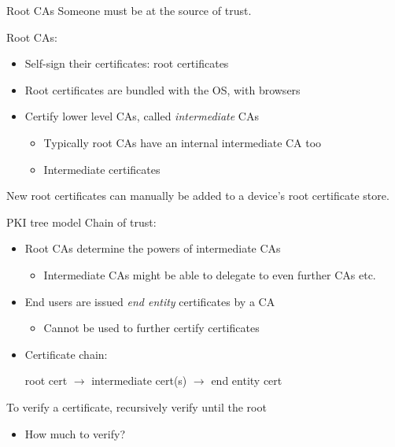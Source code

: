 \begin{frame}{Root CAs}
  Someone must be at the source of trust.

  \pause
  Root CAs:
  \begin{itemize}[<+(1)->]
    \item Self-sign their certificates: root certificates
    \item Root certificates are bundled with the OS, with browsers
    \item Certify lower level CAs, called \emph{intermediate} CAs
    \begin{itemize}
      \item Typically root CAs have an internal intermediate CA too
      \item Intermediate certificates
    \end{itemize}
  \end{itemize}

  \pause
  New root certificates can manually be added to a device's root certificate store.
\end{frame}

\begin{frame}{PKI tree model}
  \pause
  Chain of trust:
  \begin{itemize}[<+(1)->]
    \item Root CAs determine the powers of intermediate CAs
    \begin{itemize}
      \item Intermediate CAs might be able to delegate to even further CAs etc.
    \end{itemize}
    \item End users are issued \emph{end entity} certificates by a CA
    \begin{itemize}
      \item Cannot be used to further certify certificates
    \end{itemize}
    \item Certificate chain:
    \begin{center}
      root cert $\to$ intermediate cert(s) $\to$ end entity cert
    \end{center}
  \end{itemize}

  \vfill

  \pause
  To verify a certificate, recursively verify until the root
  \begin{itemize}[<+(1)->]
    \item How much to verify?
  \end{itemize}
\end{frame}

